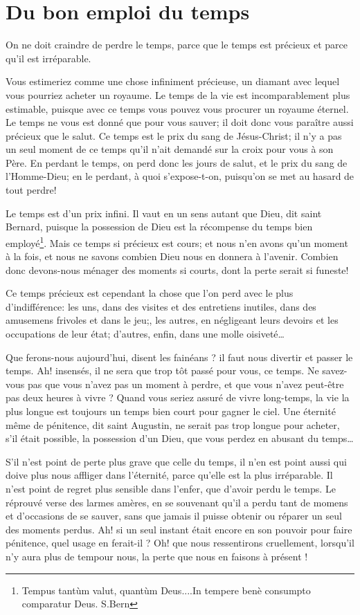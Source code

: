 \documentclass[instructions.tex]{subfiles}
\begin{document}
 
\chapter{Du bon emploi du temps}
 
On ne doit craindre de perdre le temps, parce que le temps est précieux et parce qu'il est irréparable. 

\primo Vous estimeriez comme une chose infiniment précieuse, un diamant avec lequel vous pourriez acheter un royaume. Le temps de la vie est incomparablement plus estimable, puisque avec ce temps vous pouvez vous procurer un royaume éternel. Le temps ne vous est donné que pour vous sauver; il doit donc vous paraître aussi précieux que le salut. Ce temps est le prix du sang de Jésus-Christ; il n'y a pas un seul moment de ce temps qu'il n'ait demandé sur la croix pour vous à son Père. En perdant le temps, on perd donc les jours de salut, et le prix du sang de l'Homme-Dieu; en le perdant, à quoi s'expose-t-on, puisqu'on se met au hasard de tout perdre! 

Le temps est d'un prix infini. Il vaut en un sens autant que Dieu, dit saint Bernard, puisque la possession de Dieu est la récompense du temps bien employé\footnote{Tempus tantùm valut, quantùm Deus....In tempere benè consumpto comparatur Deus. S.Bern}. Mais ce temps si précieux est cours; et nous n'en avons qu'un moment à la fois, et nous ne savons combien Dieu nous en donnera à l'avenir. Combien donc devons-nous ménager des moments si courts, dont la perte serait si funeste!

Ce temps précieux est cependant la chose que l'on perd avec le plus d'indifférence: les uns, dans des visites et des entretiens inutiles, dans des amusemens frivoles et dans le jeu;, les autres, en négligeant leurs devoirs et les occupations de leur état; d'autres, enfin, dans une molle oisiveté\dots

Que ferons-nous aujourd'hui, disent les fainéans ? il faut nous divertir et passer le temps. Ah! insensés, il ne sera que trop tôt passé pour vous, ce temps. Ne savez-vous pas que vous n'avez pas un moment à perdre, et que vous n'avez peut-être pas deux heures à vivre ? Quand vous seriez assuré de vivre long-temps, la vie la plus longue est toujours un temps bien court pour gagner le ciel. Une éternité même de pénitence, dit saint Augustin, ne serait pas trop longue pour acheter, s'il était possible, la possession d'un Dieu, que vous perdez en abusant du temps\dots

\secundo S'il n'est point de perte plus grave que celle du temps, il n'en est point aussi qui doive plus nous affliger dans l'éternité, parce qu'elle est la plus irréparable. Il n'est point de regret plus sensible dans l'enfer, que d'avoir perdu le temps. Le réprouvé verse des larmes amères, en se souvenant qu'il a perdu tant de momens et d'occasions de se sauver, sans que jamais il puisse obtenir ou réparer un seul des moments perdus. Ah! si un seul instant était encore en son pouvoir pour faire pénitence, quel usage en ferait-il ? Oh! que nous ressentirons cruellement, lorsqu'il n'y aura plus de tempour nous, la perte que nous en faisons à présent ! 
\end{document}

